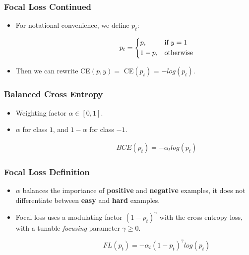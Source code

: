 \documentclass[10pt,fleqn,unknownkeysallowed]{beamer}
\begin{document}
\begin{frame}
	\frametitle{Focal Loss Continued}
	\begin{itemize}
		\item{ For notational convenience, we define $p_t$:}
	\end{itemize}
	\begin{center}
		\begin{align*}
		\quad \quad \quad \quad  \quad \quad \quad \quad
		p_t= 
		\begin{dcases}
		p,& \text{if } y=1\\
		1-p,              & \text{otherwise}
		\end{dcases}
		\end{align*}
	\end{center}
	\begin{itemize}
		\item{Then we can rewrite CE$(p,y) = $ CE$(p_t)$ = $-log(p_t)$.}
	\end{itemize}
\end{frame}

\begin{frame}
	\frametitle{Balanced Cross Entropy}
	\linespread{1.5}
	\begin{itemize}
		\item{Weighting factor $\alpha \in [0,1]$.}
		\item $\alpha$ for class $1$, and $ 1 - \alpha$ for class $-1$.
	\end{itemize}	
	\begin{center}
		\begin{align*}
		\quad \quad \quad \quad  \quad \quad  \quad \quad BCE(p_t) = - \alpha_t log(p_t)
		\end{align*}
	\end{center}
\end{frame}

\begin{frame}
	\frametitle{Focal Loss Definition}
	\linespread{1.5}
	\begin{itemize}
		\item{$\alpha$ balances the importance of \textbf{positive} and \textbf{negative} examples, it does not differentiate between \textbf{easy} and \textbf{hard} examples.}
		\item{Focal loss uses a modulating factor $(1 - p_t)^\gamma$ with the cross entropy loss, with a tunable \textit{focusing} parameter $\gamma \ge 0$.}
	\end{itemize}
	\begin{center}
		\begin{equation*}
		\quad  \quad \quad \quad  \quad \quad \quad \quad FL(p_t) = - \alpha_t (1 - p_t)^\gamma log(p_t)
		\end{equation*}
	\end{center}

\end{frame}
\end{document}
